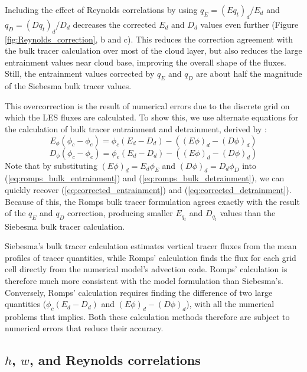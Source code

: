 \documentclass[12pt]{article}
\begin{document}
Including the effect of Reynolds correlations by using $q_E = (E q_t)_d/E_d$ 
and $q_D = (D q_t)_d/D_d$ decreases the corrected $E_d$ and $D_d$ values even 
further (Figure \ref{fig:Reynolds_correction}, b and c).  This reduces the 
correction agreement with the bulk tracer calculation over most of the cloud 
layer, but also reduces the large entrainment values near cloud base, improving 
the overall shape of the fluxes.  Still, the entrainment values corrected by 
$q_E$ and $q_D$ are about half the magnitude of the Siebesma bulk tracer 
values.

This overcorrection is the result of numerical errors due to the discrete 
grid on which the LES fluxes are calculated.  To show this, we use alternate 
equations for the calculation of bulk tracer entrainment and detrainment, 
derived by \cite{Romps2010}:
\begin{equation}
  \label{eq:romps_bulk_entrainment}
    E_{\phi}(\phi_c - \phi_e) = \phi_c(E_d-D_d) - ((E\phi)_d - (D\phi)_d)
\end{equation}
\begin{equation}
  \label{eq:romps_bulk_detrainment}
    D_{\phi}(\phi_c - \phi_e) = \phi_e(E_d-D_d) - ((E\phi)_d - (D\phi)_d)
\end{equation}
Note that by substituting $(E\phi)_d = E_d \phi_E$ and $(D\phi)_d = D_d \phi_D$ 
into (\ref{eq:romps_bulk_entrainment}) and (\ref{eq:romps_bulk_detrainment}),
we can quickly recover (\ref{eq:corrected_entrainment}) and 
(\ref{eq:corrected_detrainment}).  Because of this, the Romps bulk tracer 
formulation agrees exactly with the result of the $q_E$ and $q_D$ correction,
producing smaller $E_{q_t}$ and $D_{q_t}$ values than the Siebesma bulk tracer 
calculation.  

Siebesma's bulk tracer calculation estimates vertical tracer fluxes from the 
mean profiles of tracer quantities, while Romps' calculation finds the flux for 
each grid cell directly from the numerical model's advection code.  Romps' 
calculation is therefore much more consistent with the model formulation than 
Siebesma's.  Conversely, Romps' calculation requires finding the difference of 
two large quantities ($\phi_c(E_d-D_d)$ and $(E\phi)_d - (D\phi)_d$), with all 
the numerical problems that implies.  Both these calculation methods therefore 
are subject to numerical errors that reduce their accuracy.  


\subsection{$h$, $w$, and Reynolds correlations}
\end{document}
